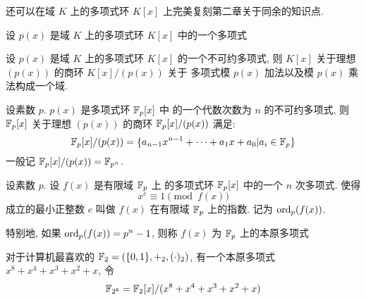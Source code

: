 还可以在域 \(K\) 上的多项式环 \(K[x]\) 上完美复刻第二章关于同余的知识点.

\begin{definition}[多项式环的商环]
    设 \(p(x)\) 是域 \(K\) 上的多项式环 \(K[x]\) 中的一个多项式
\end{definition}

\begin{theorem}
    设 \(p(x)\) 是域 \(K\) 上的多项式环 \(K[x]\) 的一个不可约多项式, 
    则 \(K[x]\) 关于理想 \((p(x))\) 的商环 \(K[x]/(p(x))\) 关于
    多项式模 \(p(x)\) 加法以及模 \(p(x)\) 乘法构成一个域.
\end{theorem}
    
\begin{theorem}
    设素数 \(p\). \(p(x)\) 是多项式环 \(\mathbb{F}_p[x]\) 中
    的一个代数次数为 \(n\) 的不可约多项式, 则 \(\mathbb{F}_p[x]\)
    关于理想 \((p(x))\) 的商环 \(\mathbb{F}_p[x]/(p(x))\) 满足:
    \[\mathbb{F}_p[x]/(p(x)) = \{a_{n-1}x^{n-1} + \cdots + a_1 x + a_0|a_i \in \mathbb{F}_p\}\]
    一般记 \(\mathbb{F}_p[x]/(p(x)) = \mathbb{F}_{p^n}\).
\end{theorem}

\begin{definition}[本原多项式]
    设素数 \(p\). 设 \(f(x)\) 是有限域 \(\mathbb{F}_p\) 上
    的多项式环 \(\mathbb{F}_p[x]\) 中的一个 \(n\) 次多项式. 使得
    \[x^e \equiv 1 \pmod{f(x)}\]
    成立的最小正整数 \(e\) 叫做 \(f(x)\) 在有限域 \(\mathbb{F}_p\)
    上的指数. 记为 \(\mathrm{ord}_{p}(f(x))\).

    特别地, 如果 \(\mathrm{ord}_{p}(f(x)) = p^n - 1\), 则称 \(f(x)\)
    为 \(\mathbb{F}_p\) 上的本原多项式
\end{definition}

\begin{example}
    对于计算机最喜欢的 \(\mathbb{F}_2 = (\{0,1\},+_2, (\cdot)_2)\),
    有一个本原多项式 \(x^8+x^4+x^3+x^2+x\), 令
    \[\mathbb{F}_{2^8} = \mathbb{F}_2[x]/(x^8+x^4+x^3+x^2+x)\]
\end{example}

